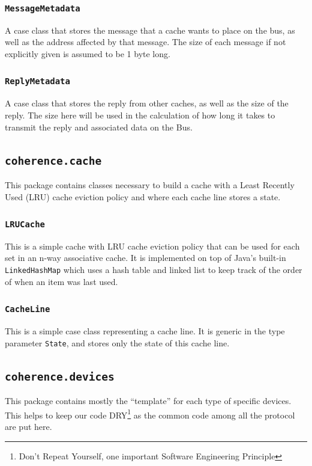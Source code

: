 \documentclass[nonacm,acmsmall,screen,11pt]{acmart}
\begin{document}
\subsubsection{\texttt{MessageMetadata}}
A case class that stores the message that a cache wants to place on the bus, as well as the address affected by that message.
The size of each message if not explicitly given is assumed to be 1 byte long.

\subsubsection{\texttt{ReplyMetadata}}
A case class that stores the reply from other caches, as well as the size of the reply.
The size here will be used in the calculation of how long it takes to transmit the reply and associated data on the Bus.

\subsection{\texttt{coherence.cache}}
This package contains classes necessary to build a cache with a Least Recently Used (LRU) cache eviction policy and where each cache line stores a state.

\subsubsection{\texttt{LRUCache}}
This is a simple cache with LRU cache eviction policy that can be used for each set in an n-way associative cache.
It is implemented on top of Java's built-in \texttt{LinkedHashMap} which uses a hash table and linked list to keep track of the order of when an item was last used.

\subsubsection{\texttt{CacheLine}}
This is a simple case class representing a cache line.
It is generic in the type parameter \texttt{State}, and stores only the state of this cache line.

\subsection{\texttt{coherence.devices}}
This package contains mostly the ``template'' for each type of specific devices.
This helps to keep our code DRY\footnote{Don't Repeat Yourself, one important Software Engineering Principle} as the common code among all the protocol are put here.
\end{document}
